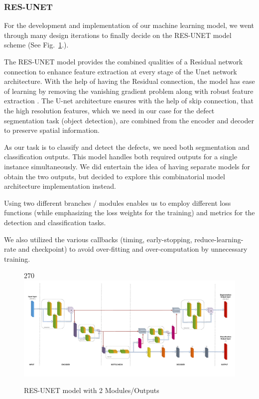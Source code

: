 \documentclass[12pt]{article}
\begin{document}
\clearpage
\newpage

\subsubsection{RES-UNET}
For the development and implementation of our machine learning model, we went through many design iterations to finally decide on the RES-UNET model scheme (See Fig.~\ref{fig:resunetmodel}.).

The RES-UNET model provides the combined qualities of a Residual network connection to enhance feature extraction at every stage of the Unet network architecture. With the help of having the Residual connection, the model has ease of learning by removing the vanishing gradient problem along with robust feature extraction \cite{Zhao2020}. The U-net architecture ensures with the help of skip connection, that the high resolution features, which we need in our case for the defect segmentation task (object detection), are combined from the encoder and decoder to preserve spatial information.

As our task is to classify and detect the defects, we need both segmentation and classification outputs. This model handles both required outputs for a single instance simultaneously. We did entertain the idea of having separate models for obtain the two outputs, but decided to explore this combinatorial model architecture implementation instead.

Using two different branches / modules enables us to employ different loss functions (while emphasizing the loss weights for the training) and metrics for the detection and classification tasks.

We also utilized the various callbacks (timing, early-stopping, reduce-learning-rate and checkpoint) to avoid over-fitting and over-computation by unnecessary training. 

\begin{figure}[p]
    \centering
    \begin{turn}{270}
    \includegraphics[width=1.2\paperwidth,height=1.2\paperheight,keepaspectratio]{./graphics/model-unet.png}
    \end{turn}
    \caption{RES-UNET model with 2 Modules/Outputs}
    \label{fig:resunetmodel}
\end{figure}
\restoregeometry
\end{document}
